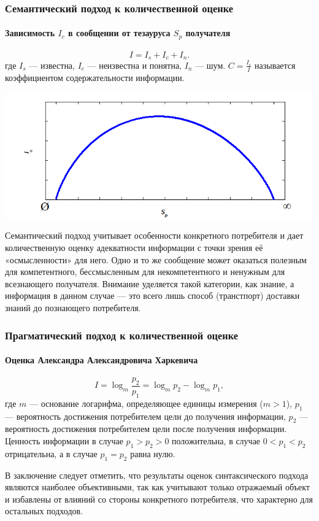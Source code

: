 \begin{frame}
    \frametitle{Семантический подход к количественной оценке}
    \framesubtitle{Зависимость $I_c$ в сообщении от тезауруса $S_p$ получателя}

    \[I=I_s + I_c + I_n.\]
    где $I_s$ --- известна, $I_c$ --- неизвестна и понятна, $I_n$ --- шум. $C=\frac{I_c}{I}$ называется коэффициентом содержательности информации.
    \begin{center}
        \includegraphics[height=.45\textheight]{fig/semantic} 
    \end{center}
\end{frame}

Семантический подход учитывает особенности конкретного потребителя и дает количественную оценку адекватности информации с точки зрения её «осмысленности» для него. Одно и то же сообщение может оказаться полезным для компетентного, бессмысленным для некомпетентного и ненужным для всезнающего получателя. Внимание уделяется такой категории, как знание, а информация в данном случае --- это всего лишь способ (транстпорт) доставки знаний до познающего потребителя.


\begin{frame}
    \frametitle{Прагматический подход к количественной оценке}
    \framesubtitle{Оценка Александра Александровича Харкевича}
    
    \begin{equation}
        I=\log_{m}\frac{p_2}{p_1}=\log_{m}p_2 - \log_{m}p_1,
    \end{equation}
    где $m$ --- основание логарифма, определяющее единицы измерения ($m>1$), $p_1$ --- вероятность достижения потребителем \alert{цели} до получения информации, $p_2$ --- вероятность достижения потребителем цели после получения информации. Ценность информации в случае $p_1>p_2>0$ положительна, в случае $0<p_1<p_2$ отрицательна, а в случае $p_1=p_2$ равна нулю.
\end{frame}

В заключение следует отметить, что результаты оценок синтаксического подхода являются наиболее объективными, так как учитывают только отражаемый объект и избавлены от влияний со стороны конкретного потребителя, что характерно для остальных подходов.

